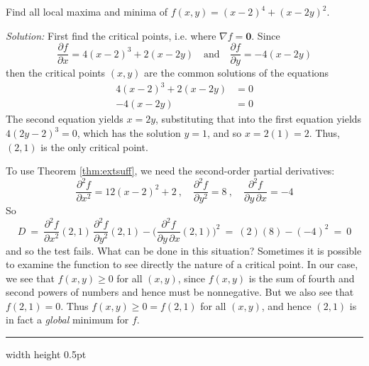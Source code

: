 \begin{exmp}\label{exmp:globalmin}
 Find all local maxima and minima of $f(x,y) = (x-2)^4 + (x-2y)^2$.\smallskip
 \par\noindent\emph{Solution:} First find the critical points, i.e. where $\nabla f = \textbf{0}$. Since
 \begin{displaymath}
  \frac{\partial f}{\partial x} = 4(x-2)^3 + 2(x-2y) \quad \text{and} \quad \frac{\partial f}{\partial y} = -4(x-2y)
 \end{displaymath}
 then the critical points $(x,y)$ are the common solutions of the equations
 \begin{align*}
  4(x-2)^3 + 2(x-2y) &= 0\\
  -4(x-2y) &= 0
 \end{align*}
 The second equation yields $x=2y$, substituting that into the first equation yields $4(2y-2)^3 = 0$, which has
 the solution $y=1$, and so $x =2(1) = 2$. Thus, $(2,1)$ is the only critical point.
 
 To use Theorem \ref{thm:extsuff}, we need the second-order partial derivatives:
 \begin{displaymath}
  \frac{\partial^2 f}{\partial x^2} = 12(x-2)^2 + 2 ~,\quad \frac{\partial^2 f}{\partial y^2} = 8 ~,\quad
  \dfrac{\partial^2 f}{\partial y \, \partial x} = -4
 \end{displaymath}
So
 \begin{displaymath}
  D ~=~ \dfrac{\partial^2 f}{\partial x^2}(2,1) \, \dfrac{\partial^2 f}{\partial y^2}(2,1) -
 \biggl( \dfrac{\partial^2 f}{\partial y \, \partial x}(2,1) \biggr)^2 ~=~ (2)(8) - (-4)^2 ~=~ 0
 \end{displaymath}
 and so the test fails. What can be done in this situation? Sometimes it is possible to examine the function to see
 directly the nature of a critical point. In our case, we see that $f(x,y) \ge 0$ for all $(x,y)$, since $f(x,y)$ is
 the sum of fourth and second powers of numbers and hence must be nonnegative. But we also see that $f(2,1) = 0$.
 Thus $f(x,y) \ge 0 = f(2,1)$ for all $(x,y)$, and hence $(2,1)$ is in fact a \emph{global} minimum for $f$.
\end{exmp}
\hrule width \textwidth height 0.5pt
